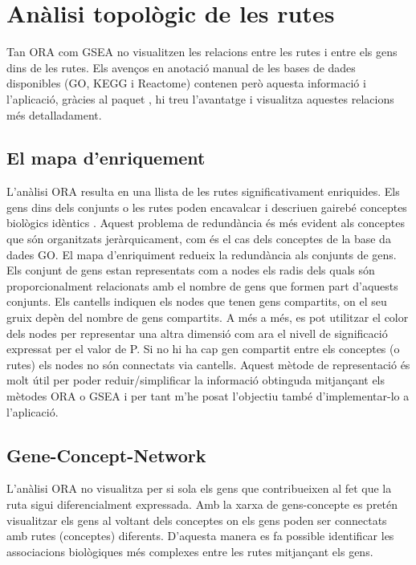 \section{Anàlisi topològic de les rutes}
Tan \gls{ORA} com \gls{GSEA} no visualitzen les relacions entre les rutes i entre els gens dins de les rutes. Els avenços en anotació manual de les bases de dades disponibles (\gls{GO}, \gls{KEGG} i Reactome) contenen però aquesta informació i l'aplicació, gràcies al paquet , hi treu l'avantatge i visualitza aquestes relacions més detalladament. 

\subsection{El mapa d'enriquement}

L’anàlisi \gls{ORA} resulta en una llista de les rutes significativament  enriquides. Els gens dins dels conjunts o les rutes poden encavalcar i descriuen gairebé conceptes biològics idèntics \cite{merico2010enrichment}. Aquest problema de redundància és més evident als conceptes que són organitzats jeràrquicament, com és el cas dels conceptes de la base da dades \gls{GO}.  El mapa d’enriquiment redueix la redundància als conjunts de gens. Els conjunt de gens estan representats com a nodes els radis dels quals són proporcionalment relacionats amb el nombre de gens que formen part d’aquests conjunts. Els cantells indiquen els nodes que tenen gens compartits, on el seu gruix depèn del nombre de gens compartits. A més a més, es pot utilitzar el color dels nodes per representar una altra dimensió com ara el nivell de significació expressat per el valor de P. Si no hi ha cap gen compartit entre els conceptes (o rutes) els nodes no són connectats via  cantells. Aquest mètode de representació és molt útil per poder reduir/simplificar la informació obtinguda mitjançant els mètodes \gls{ORA} o \gls{GSEA} i per tant m’he posat l’objectiu també d’implementar-lo a l’aplicació. 

\subsection{\gls{Gene-Concept-Network}}

L'anàlisi \gls{ORA} no visualitza per si sola els gens que contribueixen al fet que la ruta sigui diferencialment expressada. Amb la xarxa de gens-concepte es pretén visualitzar els gens al voltant dels conceptes on els gens poden ser connectats amb rutes (conceptes) diferents. D'aquesta manera es fa possible identificar les associacions biològiques més complexes entre les rutes mitjançant els gens. 

